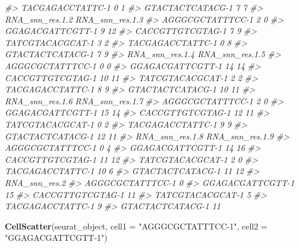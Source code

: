 \documentclass[
]{book}
\newenvironment{Shaded}{\begin{snugshade}}{\end{snugshade}}
\newcommand{\AttributeTok}[1]{\textcolor[rgb]{0.13,0.29,0.53}{#1}}
\newcommand{\CommentTok}[1]{\textcolor[rgb]{0.56,0.35,0.01}{\textit{#1}}}
\newcommand{\FunctionTok}[1]{\textcolor[rgb]{0.13,0.29,0.53}{\textbf{#1}}}
\newcommand{\NormalTok}[1]{#1}
\newcommand{\StringTok}[1]{\textcolor[rgb]{0.31,0.60,0.02}{#1}}
\begin{document}
\begin{Shaded}
\begin{Highlighting}[]
\CommentTok{\#\textgreater{} TACGAGACCTATTC{-}1             0               1}
\CommentTok{\#\textgreater{} GTACTACTCATACG{-}1             7               7}
\CommentTok{\#\textgreater{}                  RNA\_snn\_res.1.2 RNA\_snn\_res.1.3}
\CommentTok{\#\textgreater{} AGGGCGCTATTTCC{-}1               2               0}
\CommentTok{\#\textgreater{} GGAGACGATTCGTT{-}1               9              12}
\CommentTok{\#\textgreater{} CACCGTTGTCGTAG{-}1               7               9}
\CommentTok{\#\textgreater{} TATCGTACACGCAT{-}1               3               2}
\CommentTok{\#\textgreater{} TACGAGACCTATTC{-}1               0               8}
\CommentTok{\#\textgreater{} GTACTACTCATACG{-}1               7               9}
\CommentTok{\#\textgreater{}                  RNA\_snn\_res.1.4 RNA\_snn\_res.1.5}
\CommentTok{\#\textgreater{} AGGGCGCTATTTCC{-}1               0               0}
\CommentTok{\#\textgreater{} GGAGACGATTCGTT{-}1              14              14}
\CommentTok{\#\textgreater{} CACCGTTGTCGTAG{-}1              10              11}
\CommentTok{\#\textgreater{} TATCGTACACGCAT{-}1               2               2}
\CommentTok{\#\textgreater{} TACGAGACCTATTC{-}1               8               9}
\CommentTok{\#\textgreater{} GTACTACTCATACG{-}1              10              11}
\CommentTok{\#\textgreater{}                  RNA\_snn\_res.1.6 RNA\_snn\_res.1.7}
\CommentTok{\#\textgreater{} AGGGCGCTATTTCC{-}1               2               0}
\CommentTok{\#\textgreater{} GGAGACGATTCGTT{-}1              15              14}
\CommentTok{\#\textgreater{} CACCGTTGTCGTAG{-}1              12              11}
\CommentTok{\#\textgreater{} TATCGTACACGCAT{-}1               0               2}
\CommentTok{\#\textgreater{} TACGAGACCTATTC{-}1               9               9}
\CommentTok{\#\textgreater{} GTACTACTCATACG{-}1              12              11}
\CommentTok{\#\textgreater{}                  RNA\_snn\_res.1.8 RNA\_snn\_res.1.9}
\CommentTok{\#\textgreater{} AGGGCGCTATTTCC{-}1               0               4}
\CommentTok{\#\textgreater{} GGAGACGATTCGTT{-}1              14              16}
\CommentTok{\#\textgreater{} CACCGTTGTCGTAG{-}1              11              12}
\CommentTok{\#\textgreater{} TATCGTACACGCAT{-}1               2               0}
\CommentTok{\#\textgreater{} TACGAGACCTATTC{-}1              10               6}
\CommentTok{\#\textgreater{} GTACTACTCATACG{-}1              11              12}
\CommentTok{\#\textgreater{}                  RNA\_snn\_res.2}
\CommentTok{\#\textgreater{} AGGGCGCTATTTCC{-}1             0}
\CommentTok{\#\textgreater{} GGAGACGATTCGTT{-}1            15}
\CommentTok{\#\textgreater{} CACCGTTGTCGTAG{-}1            11}
\CommentTok{\#\textgreater{} TATCGTACACGCAT{-}1             5}
\CommentTok{\#\textgreater{} TACGAGACCTATTC{-}1             9}
\CommentTok{\#\textgreater{} GTACTACTCATACG{-}1            11}

\FunctionTok{CellScatter}\NormalTok{(seurat\_object, }\AttributeTok{cell1 =} \StringTok{"AGGGCGCTATTTCC{-}1"}\NormalTok{, }\AttributeTok{cell2 =} \StringTok{"GGAGACGATTCGTT{-}1"}\NormalTok{)}
\end{Highlighting}
\end{Shaded}
\end{document}
